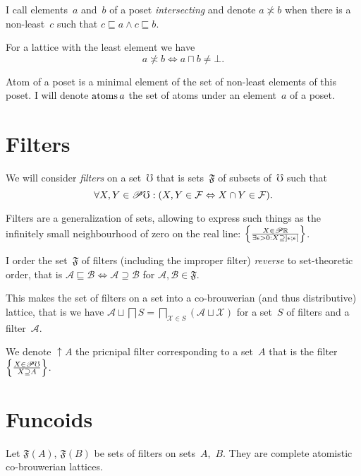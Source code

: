 \documentclass{amsart}
\begin{document}
I call elements~$a$ and~$b$ of a poset \emph{intersecting} and
denote $a\nasymp b$ when there is a non-least~$c$ such that $c\sqsubseteq a\land c\sqsubseteq b$.

For a lattice with the least element we have
\[ a\nasymp b \Leftrightarrow a\sqcap b\ne\bot. \]

Atom of a poset is a minimal element of the set of non-least elements of this poset.
I will denote $\operatorname{atoms} a$ the set of atoms under an element~$a$ of a poset.

\section{Filters}

We will consider \emph{filters} on a set~$\mho$ that is sets~$\mathfrak{F}$ of subsets of~$\mho$ such that
\[ \forall X,Y\in\mathscr{P}\mho:
(X,Y\in\mathcal{F} \Leftrightarrow X\cap Y\in\mathcal{F}). \]

Filters are a generalization of sets, allowing to express such things as the infinitely small neighbourhood of zero on the real line: $\left\{ \frac{X\in\mathscr{P}\mathbb{R}}{\exists\epsilon>0:X\supseteq\left]\epsilon;\epsilon\right[}\right\}$.

\begin{defn}
I order the set~$\mathfrak{F}$ of filters (including the improper filter) \emph{reverse} to set-theoretic order, that is
$\mathcal{A} \sqsubseteq \mathcal{B} \Leftrightarrow \mathcal{A} \supseteq \mathcal{B}$
for $\mathcal{A},\mathcal{B}\in\mathfrak{F}$.
\end{defn}

\begin{prop}
This makes the set of filters on a set into a co-brouwerian (and thus distributive) lattice, that is we have
$\mathcal{A} \sqcup \bigsqcap S = \bigsqcap_{\mathcal{X}\in S} (\mathcal{A} \sqcup \mathcal{X})$
for a set~$S$ of filters and a filter~$\mathcal{A}$.
\end{prop}

We denote $\uparrow A$ the pricnipal filter corresponding to a set~$A$ that is the filter $\left\{ \frac{X\in\mathscr{P}\mho}{X\supseteq A}\right\}$.

\section{Funcoids}

Let $\mathfrak{F}(A)$, $\mathfrak{F}(B)$ be sets of filters on sets~$A$,~$B$.
They are complete atomistic co-brouwerian lattices.
\end{document}

